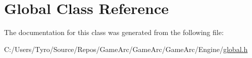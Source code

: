 \hypertarget{class_global}{}\section{Global Class Reference}
\label{class_global}


The documentation for this class was generated from the following file\+:\begin{DoxyCompactItemize}
\item 
C\+:/\+Users/\+Tyro/\+Source/\+Repos/\+Game\+Arc/\+Game\+Arc/\+Game\+Arc/\+Engine/\mbox{\hyperlink{global_8h}{global.\+h}}\end{DoxyCompactItemize}
